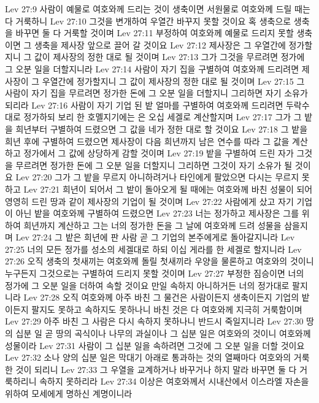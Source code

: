 Lev 27:9  사람이 예물로 여호와께 드리는 것이 생축이면 서원물로 여호와께 드릴 때는 다 거룩하니
Lev 27:10  그것을 변개하여 우열간 바꾸지 못할 것이요 혹 생축으로 생축을 바꾸면 둘 다 거룩할 것이며
Lev 27:11  부정하여 여호와께 예물로 드리지 못할 생축이면 그 생축을 제사장 앞으로 끌어 갈 것이요
Lev 27:12  제사장은 그 우열간에 정가할지니 그 값이 제사장의 정한 대로 될 것이며
Lev 27:13  그가 그것을 무르려면 정가에 그 오분 일을 더할지니라
Lev 27:14  사람이 자기 집을 구별하여 여호와께 드리려면 제사장이 그 우열간에 정가할지니 그 값이 제사장의 정한 대로 될 것이며
Lev 27:15  그 사람이 자기 집을 무르려면 정가한 돈에 그 오분 일을 더할지니 그리하면 자기 소유가 되리라
Lev 27:16  사람이 자기 기업 된 밭 얼마를 구별하여 여호와께 드리려면 두락수대로 정가하되 보리 한 호멜지기에는 은 오십 세겔로 계산할지며
Lev 27:17  그가 그 밭을 희년부터 구별하여 드렸으면 그 값을 네가 정한 대로 할 것이요
Lev 27:18  그 밭을 희년 후에 구별하여 드렸으면 제사장이 다음 희년까지 남은 연수를 따라 그 값을 계산하고 정가에서 그 값에 상당하게 감할 것이며
Lev 27:19  밭을 구별하여 드린 자가 그것을 무르려면 정가한 돈에 그 오분 일을 더할지니 그리하면 그것이 자기 소유가 될 것이요
Lev 27:20  그가 그 밭을 무르지 아니하려거나 타인에게 팔았으면 다시는 무르지 못하고
Lev 27:21  희년이 되어서 그 밭이 돌아오게 될 때에는 여호와께 바친 성물이 되어 영영히 드린 땅과 같이 제사장의 기업이 될 것이며
Lev 27:22  사람에게 샀고 자기 기업이 아닌 밭을 여호와께 구별하여 드렸으면
Lev 27:23  너는 정가하고 제사장은 그를 위하여 희년까지 계산하고 그는 너의 정가한 돈을 그 날에 여호와께 드려 성물을 삼을지며
Lev 27:24  그 밭은 희년에 판 사람 곧 그 기업의 본주에게로 돌아갈지니라
Lev 27:25  너의 모든 정가를 성소의 세겔대로 하되 이십 게라를 한 세겔로 할지니라
Lev 27:26  오직 생축의 첫새끼는 여호와께 돌릴 첫새끼라 우양을 물론하고 여호와의 것이니 누구든지 그것으로는 구별하여 드리지 못할 것이며
Lev 27:27  부정한 짐승이면 너의 정가에 그 오분 일을 더하여 속할 것이요 만일 속하지 아니하거든 너의 정가대로 팔지니라
Lev 27:28  오직 여호와께 아주 바친 그 물건은 사람이든지 생축이든지 기업의 밭이든지 팔지도 못하고 속하지도 못하나니 바친 것은 다 여호와께 지극히 거룩함이며
Lev 27:29  아주 바친 그 사람은 다시 속하지 못하나니 반드시 죽일지니라
Lev 27:30  땅의 십분 일 곧 땅의 곡식이나 나무의 과실이나 그 십분 일은 여호와의 것이니 여호와께 성물이라
Lev 27:31  사람이 그 십분 일을 속하려면 그것에 그 오분 일을 더할 것이요
Lev 27:32  소나 양의 십분 일은 막대기 아래로 통과하는 것의 열째마다 여호와의 거룩한 것이 되리니
Lev 27:33  그 우열을 교계하거나 바꾸거나 하지 말라 바꾸면 둘 다 거룩하리니 속하지 못하리라
Lev 27:34  이상은 여호와께서 시내산에서 이스라엘 자손을 위하여 모세에게 명하신 계명이니라


